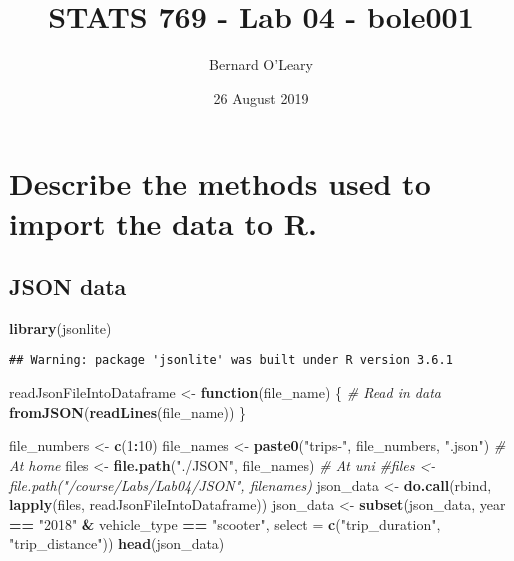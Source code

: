 \documentclass[]{article}
\title{STATS 769 - Lab 04 - bole001}
\author{Bernard O'Leary}
\date{26 August 2019}
\newenvironment{Shaded}{\begin{snugshade}}{\end{snugshade}}
\newcommand{\KeywordTok}[1]{\textcolor[rgb]{0.13,0.29,0.53}{\textbf{#1}}}
\newcommand{\DataTypeTok}[1]{\textcolor[rgb]{0.13,0.29,0.53}{#1}}
\newcommand{\DecValTok}[1]{\textcolor[rgb]{0.00,0.00,0.81}{#1}}
\newcommand{\StringTok}[1]{\textcolor[rgb]{0.31,0.60,0.02}{#1}}
\newcommand{\CommentTok}[1]{\textcolor[rgb]{0.56,0.35,0.01}{\textit{#1}}}
\newcommand{\ControlFlowTok}[1]{\textcolor[rgb]{0.13,0.29,0.53}{\textbf{#1}}}
\newcommand{\OperatorTok}[1]{\textcolor[rgb]{0.81,0.36,0.00}{\textbf{#1}}}
\newcommand{\NormalTok}[1]{#1}
\begin{document}
\maketitle

\section{Describe the methods used to import the data to
R.}\label{describe-the-methods-used-to-import-the-data-to-r.}

\subsection{JSON data}\label{json-data}

\begin{Shaded}
\begin{Highlighting}[]
\KeywordTok{library}\NormalTok{(jsonlite)}
\end{Highlighting}
\end{Shaded}

\begin{verbatim}
## Warning: package 'jsonlite' was built under R version 3.6.1
\end{verbatim}

\begin{Shaded}
\begin{Highlighting}[]
\NormalTok{readJsonFileIntoDataframe <-}\StringTok{ }\ControlFlowTok{function}\NormalTok{(file_name) \{}
  \CommentTok{# Read in data}
  \KeywordTok{fromJSON}\NormalTok{(}\KeywordTok{readLines}\NormalTok{(file_name))}
\NormalTok{\}}


\NormalTok{file_numbers <-}\StringTok{ }\KeywordTok{c}\NormalTok{(}\DecValTok{1}\OperatorTok{:}\DecValTok{10}\NormalTok{)}
\NormalTok{file_names <-}\StringTok{ }\KeywordTok{paste0}\NormalTok{(}\StringTok{"trips-"}\NormalTok{, file_numbers, }\StringTok{".json"}\NormalTok{)}
\CommentTok{# At home}
\NormalTok{files <-}\StringTok{ }\KeywordTok{file.path}\NormalTok{(}\StringTok{"./JSON"}\NormalTok{, file_names)}
\CommentTok{# At uni}
\CommentTok{#files <- file.path("/course/Labs/Lab04/JSON", filenames)}
\NormalTok{json_data <-}\StringTok{ }\KeywordTok{do.call}\NormalTok{(rbind, }\KeywordTok{lapply}\NormalTok{(files, readJsonFileIntoDataframe))}
\NormalTok{json_data <-}\StringTok{ }\KeywordTok{subset}\NormalTok{(json_data, year }\OperatorTok{==}\StringTok{ "2018"} \OperatorTok{&}\StringTok{ }\NormalTok{vehicle_type }\OperatorTok{==}\StringTok{ "scooter"}\NormalTok{, }\DataTypeTok{select =} \KeywordTok{c}\NormalTok{(}\StringTok{"trip_duration"}\NormalTok{, }\StringTok{"trip_distance"}\NormalTok{))}
\KeywordTok{head}\NormalTok{(json_data)}
\end{Highlighting}
\end{Shaded}
\end{document}
